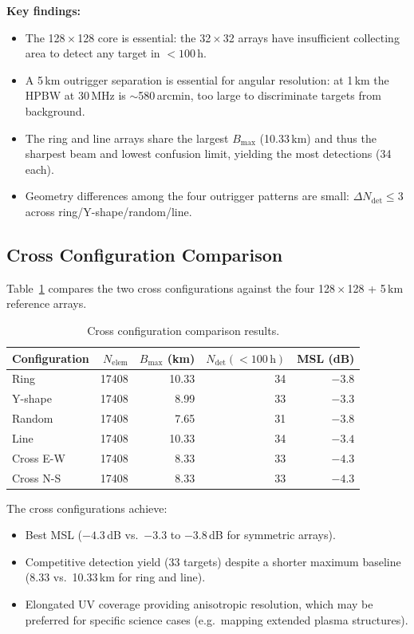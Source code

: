 \documentclass[12pt,a4paper]{article}
\begin{document}
\textbf{Key findings:}
\begin{itemize}
  \item The 128\,$\times$\,128 core is essential: the 32\,$\times$\,32 arrays
    have insufficient collecting area to detect any target in $<100$\,h.
  \item A 5\,km outrigger separation is essential for angular resolution: at
    1\,km the HPBW at 30\,MHz is $\sim$580\,arcmin, too large to discriminate
    targets from background.
  \item The ring and line arrays share the largest $B_\mathrm{max}$ (10.33\,km)
    and thus the sharpest beam and lowest confusion limit, yielding the most
    detections (34 each).
  \item Geometry differences among the four outrigger patterns are small:
    $\Delta N_\mathrm{det} \le 3$ across ring/Y-shape/random/line.
\end{itemize}

\subsection{Cross Configuration Comparison}

Table~\ref{tab:cross_results} compares the two cross configurations against the
four 128\,$\times$\,128 + 5\,km reference arrays.

\begin{table}[H]
  \centering
  \caption{Cross configuration comparison results.}
  \label{tab:cross_results}
  \begin{tabular}{lrrrr}
    \toprule
    Configuration & $N_\mathrm{elem}$ & $B_\mathrm{max}$ (km)
      & $N_\mathrm{det}(<100\,\mathrm{h})$ & MSL (dB) \\
    \midrule
    Ring             & 17408 & 10.33 & 34 & $-3.8$ \\
    Y-shape          & 17408 &  8.99 & 33 & $-3.3$ \\
    Random           & 17408 &  7.65 & 31 & $-3.8$ \\
    Line             & 17408 & 10.33 & 34 & $-3.4$ \\
    Cross E-W        & 17408 &  8.33 & 33 & $\mathbf{-4.3}$ \\
    Cross N-S        & 17408 &  8.33 & 33 & $\mathbf{-4.3}$ \\
    \bottomrule
  \end{tabular}
\end{table}

The cross configurations achieve:
\begin{itemize}
  \item Best MSL ($-4.3$\,dB vs.\ $-3.3$ to $-3.8$\,dB for symmetric arrays).
  \item Competitive detection yield (33 targets) despite a shorter maximum
    baseline (8.33 vs.\ 10.33\,km for ring and line).
  \item Elongated UV coverage providing anisotropic resolution, which may be
    preferred for specific science cases (e.g.\ mapping extended plasma
    structures).
\end{itemize}
\end{document}
